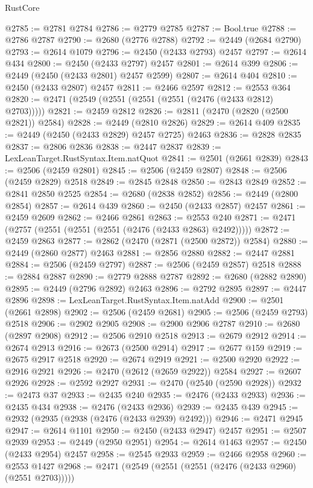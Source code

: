 \begin{lexlean}{RustCore}
\begin{coremodule}
@2785 := @2781 @2784
@2786 := @2779 @2785
@2787 := Bool.true
@2788 := @2786 @2787
@2790 := @2680 (@2776 @2788)
@2792 := @2449 (@2684 @2790)
@2793 := @2614 @1079
@2796 := @2450 (@2433 @2793) @2457
@2797 := @2614 @434
@2800 := @2450 (@2433 @2797) @2457
@2801 := @2614 @399
@2806 := @2449 (@2450 (@2433 @2801) @2457 @2599)
@2807 := @2614 @404
@2810 := @2450 (@2433 @2807) @2457
@2811 := @2466 @2597
@2812 := @2553 @364
@2820 := @2471 (@2549 (@2551 (@2551 (@2551 (@2476 (@2433 @2812) @2703)))))
@2821 := @2459 @2812
@2826 := @2811 (@2470 (@2820 (@2500 @2821)) @2584)
@2828 := @2449 (@2810 @2826)
@2829 := @2614 @409
@2835 := @2449 (@2450 (@2433 @2829) @2457 @2725) @2463
@2836 := @2828 @2835
@2837 := @2806 @2836
@2838 := @2447 @2837
@2839 := LexLeanTarget.RustSyntax.Item.natQuot
@2841 := @2501 (@2661 @2839)
@2843 := @2506 (@2459 @2801)
@2845 := @2506 (@2459 @2807)
@2848 := @2506 (@2459 @2829) @2518
@2849 := @2845 @2848
@2850 := @2843 @2849
@2852 := @2841 @2850 @2525
@2854 := @2680 (@2838 @2852)
@2856 := @2449 (@2800 @2854)
@2857 := @2614 @439
@2860 := @2450 (@2433 @2857) @2457
@2861 := @2459 @2609
@2862 := @2466 @2861
@2863 := @2553 @240
@2871 := @2471 (@2757 (@2551 (@2551 (@2551 (@2476 (@2433 @2863) @2492)))))
@2872 := @2459 @2863
@2877 := @2862 (@2470 (@2871 (@2500 @2872)) @2584)
@2880 := @2449 (@2860 @2877) @2463
@2881 := @2856 @2880
@2882 := @2447 @2881
@2884 := @2506 (@2459 @2797)
@2887 := @2506 (@2459 @2857) @2518
@2888 := @2884 @2887
@2890 := @2779 @2888 @2787
@2892 := @2680 (@2882 @2890)
@2895 := @2449 (@2796 @2892) @2463
@2896 := @2792 @2895
@2897 := @2447 @2896
@2898 := LexLeanTarget.RustSyntax.Item.natAdd
@2900 := @2501 (@2661 @2898)
@2902 := @2506 (@2459 @2681)
@2905 := @2506 (@2459 @2793) @2518
@2906 := @2902 @2905
@2908 := @2900 @2906 @2787
@2910 := @2680 (@2897 @2908)
@2912 := @2506 @2910 @2518
@2913 := @2679 @2912
@2914 := @2674 @2913
@2916 := @2673 (@2500 @2914)
@2917 := @2677 @159
@2919 := @2675 @2917 @2518
@2920 := @2674 @2919
@2921 := @2500 @2920
@2922 := @2916 @2921
@2926 := @2470 (@2612 (@2659 @2922)) @2584
@2927 := @2607 @2926
@2928 := @2592 @2927
@2931 := @2470 (@2540 (@2590 @2928))
@2932 := @2473 @37
@2933 := @2435 @240
@2935 := @2476 (@2433 @2933)
@2936 := @2435 @434
@2938 := @2476 (@2433 @2936)
@2939 := @2435 @439
@2945 := @2932 (@2935 (@2938 (@2476 (@2433 @2939) @2492)))
@2946 := @2471 @2945
@2947 := @2614 @1101
@2950 := @2450 (@2433 @2947) @2457
@2951 := @2507 @2939
@2953 := @2449 (@2950 @2951)
@2954 := @2614 @1463
@2957 := @2450 (@2433 @2954) @2457
@2958 := @2545 @2933
@2959 := @2466 @2958
@2960 := @2553 @1427
@2968 := @2471 (@2549 (@2551 (@2551 (@2476 (@2433 @2960) (@2551 @2703)))))

\end{coremodule}
\end{lexlean}
